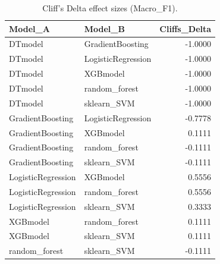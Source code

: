 \begin{table}[t]
\centering
\begin{tabular}{llr}
\toprule
Model_A & Model_B & Cliffs_Delta \\
\midrule
DTmodel & GradientBoosting & -1.0000 \\
DTmodel & LogisticRegression & -1.0000 \\
DTmodel & XGBmodel & -1.0000 \\
DTmodel & random_forest & -1.0000 \\
DTmodel & sklearn_SVM & -1.0000 \\
GradientBoosting & LogisticRegression & -0.7778 \\
GradientBoosting & XGBmodel & 0.1111 \\
GradientBoosting & random_forest & -0.1111 \\
GradientBoosting & sklearn_SVM & -0.1111 \\
LogisticRegression & XGBmodel & 0.5556 \\
LogisticRegression & random_forest & 0.5556 \\
LogisticRegression & sklearn_SVM & 0.3333 \\
XGBmodel & random_forest & 0.1111 \\
XGBmodel & sklearn_SVM & 0.1111 \\
random_forest & sklearn_SVM & -0.1111 \\
\bottomrule
\end{tabular}
\caption{Cliff's Delta effect sizes (Macro_F1).}
\label{tab:cliffs_Macro_F1}
\end{table}